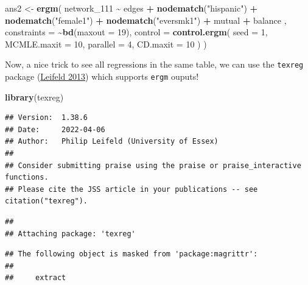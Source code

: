 \documentclass[
]{book}
\newenvironment{Shaded}{\begin{snugshade}}{\end{snugshade}}
\newcommand{\AttributeTok}[1]{\textcolor[rgb]{0.13,0.29,0.53}{#1}}
\newcommand{\DecValTok}[1]{\textcolor[rgb]{0.00,0.00,0.81}{#1}}
\newcommand{\FunctionTok}[1]{\textcolor[rgb]{0.13,0.29,0.53}{\textbf{#1}}}
\newcommand{\NormalTok}[1]{#1}
\newcommand{\OtherTok}[1]{\textcolor[rgb]{0.56,0.35,0.01}{#1}}
\newcommand{\SpecialCharTok}[1]{\textcolor[rgb]{0.81,0.36,0.00}{\textbf{#1}}}
\newcommand{\StringTok}[1]{\textcolor[rgb]{0.31,0.60,0.02}{#1}}
\begin{document}
\begin{Shaded}
\begin{Highlighting}[]
\NormalTok{ans2 }\OtherTok{\textless{}{-}} \FunctionTok{ergm}\NormalTok{(}
\NormalTok{  network\_111 }\SpecialCharTok{\textasciitilde{}}
\NormalTok{    edges }\SpecialCharTok{+}
    \FunctionTok{nodematch}\NormalTok{(}\StringTok{"hispanic"}\NormalTok{) }\SpecialCharTok{+}
    \FunctionTok{nodematch}\NormalTok{(}\StringTok{"female1"}\NormalTok{) }\SpecialCharTok{+}
    \FunctionTok{nodematch}\NormalTok{(}\StringTok{"eversmk1"}\NormalTok{) }\SpecialCharTok{+} 
\NormalTok{    mutual }\SpecialCharTok{+}
\NormalTok{    balance}
\NormalTok{    ,}
  \AttributeTok{constraints =} \SpecialCharTok{\textasciitilde{}}\FunctionTok{bd}\NormalTok{(}\AttributeTok{maxout =} \DecValTok{19}\NormalTok{),}
  \AttributeTok{control =} \FunctionTok{control.ergm}\NormalTok{(}
    \AttributeTok{seed        =} \DecValTok{1}\NormalTok{,}
    \AttributeTok{MCMLE.maxit =} \DecValTok{10}\NormalTok{,}
    \AttributeTok{parallel    =} \DecValTok{4}\NormalTok{,}
    \AttributeTok{CD.maxit    =} \DecValTok{10}
\NormalTok{    )}
\NormalTok{  )}
\end{Highlighting}
\end{Shaded}

Now, a nice trick to see all regressions in the same table, we can use the \texttt{texreg} package (\protect\hyperlink{ref-R-texreg}{Leifeld 2013}) which supports \texttt{ergm} ouputs!

\begin{Shaded}
\begin{Highlighting}[]
\FunctionTok{library}\NormalTok{(texreg)}
\end{Highlighting}
\end{Shaded}

\begin{verbatim}
## Version:  1.38.6
## Date:     2022-04-06
## Author:   Philip Leifeld (University of Essex)
## 
## Consider submitting praise using the praise or praise_interactive functions.
## Please cite the JSS article in your publications -- see citation("texreg").
\end{verbatim}

\begin{verbatim}
## 
## Attaching package: 'texreg'
\end{verbatim}

\begin{verbatim}
## The following object is masked from 'package:magrittr':
## 
##     extract
\end{verbatim}
\end{document}
